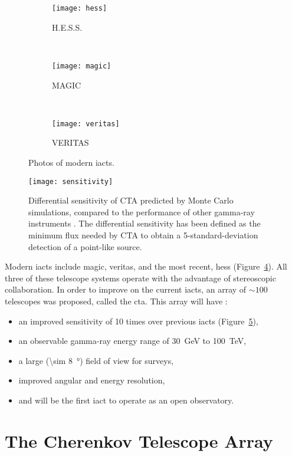 \begin{figure}
  \centering
  \begin{subfigure}[b]{0.35\textwidth}
  \texttt{[image: hess]}
  \caption{H.E.S.S.}
  \label{fig:hess}
  \end{subfigure}
  ~
  \begin{subfigure}[b]{0.35\textwidth}
  \texttt{[image: magic]}
  \caption{MAGIC}
  \label{fig:magic}
  \end{subfigure}
  ~
  \begin{subfigure}[b]{0.45\textwidth}
  \texttt{[image: veritas]}
  \caption{VERITAS}
  \label{fig:veritas}
  \end{subfigure}
  \caption{Photos of modern \glspl{iact}.}
  \label{fig:iacts}
\end{figure}

\begin{figure}
	\centering\texttt{[image: sensitivity]} 
	\caption[Differential sensitivity of CTA.]{Differential sensitivity of CTA predicted by Monte Carlo simulations, compared to the performance of other gamma-ray instruments \cite{cta-performance}. The differential sensitivity has been defined as the minimum flux needed by CTA to obtain a 5-standard-deviation detection of a point-like source.}
	\label{fig:sensitivity}
\end{figure}

Modern \glspl{iact} include \gls{magic}, \gls{veritas}, and the most recent, \gls{hess} (Figure~\ref{fig:iacts}). All three of these telescope systems operate with the advantage of stereoscopic collaboration. In order to improve on the current \glspl{iact}, an array of ${\sim} 100$ telescopes was proposed, called the \gls{cta}. This array will have \cite{Acharya2013}:
\begin{itemize}
\item an improved sensitivity of 10 times over previous \glspl{iact} (Figure~\ref{fig:sensitivity}),
\item an observable gamma-ray energy range of \SI{30}{GeV} to \SI{100}{TeV},
\item a large (\SI{\sim 8}{\degree}) field of view for surveys,
\item improved angular and energy resolution,
\item and will be the first \gls{iact} to operate as an open observatory.
\end{itemize}

\section{The Cherenkov Telescope Array}

